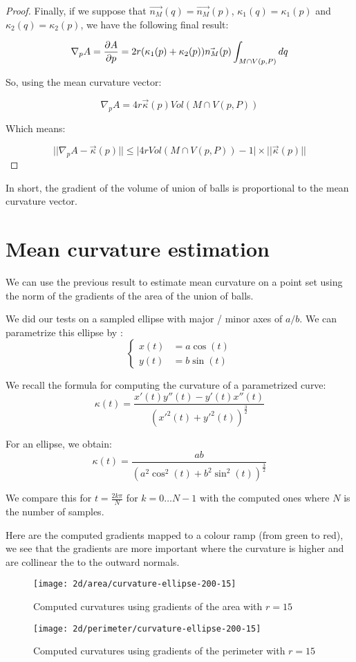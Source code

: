 \begin{proof}
Finally, if we suppose that $ \vec{n_M}(q) = \vec{n_M}(p) $, $ \kappa_1(q) =
\kappa_1(p) $ and $ \kappa_2(q) = \kappa_2(p) $, we have the following final
result:

$$ \nabla_p A = \frac{\partial{A}}{\partial{p}} = 2r (\kappa_1(p) + \kappa_2(p)) \vec{n_M}(p) \int_{M \cap V(p, P)} dq $$

So, using the mean curvature vector:

$$ \nabla_p A = 4r \vec{\kappa}(p) Vol(M \cap V(p, P)) $$

Which means:

$$ ||\nabla_p A - \vec{\kappa}(p) || \leq | 4r Vol(M \cap V(p, P)) - 1 |
\times|| \vec{\kappa}(p) ||$$

\end{proof}

In short, the gradient of the volume of union of balls is proportional to the mean
curvature vector.

\section{Mean curvature estimation}

We can use the previous result to estimate mean curvature on a point set using
the norm of the gradients of the area of the union of balls.

We did our tests on a sampled ellipse with major / minor axes of $ a / b $. We
can parametrize this ellipse by :
$$
\begin{cases}
    x(t) &= a \cos (t) \\
    y(t) &= b \sin (t)
\end{cases}
$$

We recall the formula for computing the curvature of a parametrized curve:
$$ \kappa(t) = \frac{x'(t) y''(t) - y'(t) x''(t)}{(x'^2(t) +
    y'^2(t))^{\frac{3}{2}}} $$

For an ellipse, we obtain:
$$ \kappa(t) = \frac{ab}{(a^2 \cos^2(t) + b^2 \sin^2(t))^{\frac{3}{2}}} $$

We compare this for $ t = \frac{2 k \pi}{N} $ for $ k = 0 \ldots N - 1 $ with
the computed ones where $ N $ is the number of samples.

Here are the computed gradients mapped to a colour ramp (from green to red), we see
that the gradients are more important where the curvature is higher and are
collinear the to the outward normals.

\begin{figure}[H]
    \centering

    \texttt{[image: 2d/area/curvature-ellipse-200-15]}
    \caption{Computed curvatures using gradients of the area with $ r = 15 $}

    \texttt{[image: 2d/perimeter/curvature-ellipse-200-15]}
    \caption{Computed curvatures using gradients of the perimeter with $ r = 15 $}
\end{figure}

